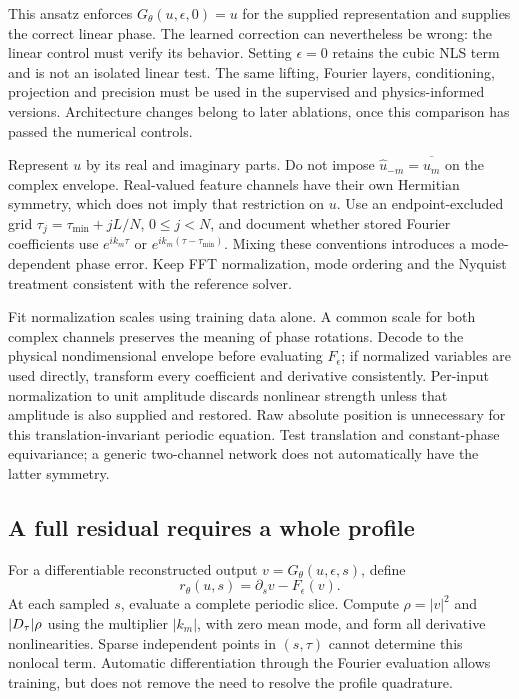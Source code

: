 This ansatz enforces $G_\theta(u,\epsilon,0)=u$ for the supplied
representation and supplies the correct linear phase.  The learned
correction can nevertheless be wrong: the linear control must verify
its behavior.  Setting $\epsilon=0$ retains the cubic NLS term and is
not an isolated linear test.  The same lifting, Fourier layers,
conditioning, projection and precision must be used in the supervised
and physics-informed versions.  Architecture changes belong to later
ablations, once this comparison has passed the numerical controls.

Represent $u$ by its real and imaginary parts.  Do not impose
$\widehat u_{-m}=\overline{\widehat u_m}$ on the complex envelope.
Real-valued feature channels have their own Hermitian symmetry, which
does not imply that restriction on $u$.  Use an endpoint-excluded grid
$\tau_j=\tau_{\min}+jL/N$, $0\leq j<N$, and document whether stored
Fourier coefficients use $e^{ik_m\tau}$ or
$e^{ik_m(\tau-\tau_{\min})}$.  Mixing these conventions introduces a
mode-dependent phase error.  Keep FFT normalization, mode ordering and
the Nyquist treatment consistent with the reference solver.

Fit normalization scales using training data alone.  A common scale for
both complex channels preserves the meaning of phase rotations.
Decode to the physical nondimensional envelope before evaluating
$F_\epsilon$; if normalized variables are used directly, transform
every coefficient and derivative consistently.  Per-input normalization
to unit amplitude discards nonlinear strength unless that amplitude is
also supplied and restored.  Raw absolute position is unnecessary for
this translation-invariant periodic equation.  Test translation and
constant-phase equivariance; a generic two-channel network does not
automatically have the latter symmetry.

\subsection{A full residual requires a whole profile}

For a differentiable reconstructed output $v=G_\theta(u,\epsilon,s)$,
define
\begin{equation}
 r_\theta(u,s)=\partial_s v-F_\epsilon(v).
 \label{eq:operator-residual}
\end{equation}
At each sampled $s$, evaluate a complete periodic slice.  Compute
$\rho=|v|^2$ and $\lvert D_\tau\rvert\rho$ using the multiplier $|k_m|$, with zero
mean mode, and form all derivative nonlinearities.  Sparse independent
points in $(s,\tau)$ cannot determine this nonlocal term.  Automatic
differentiation through the Fourier evaluation allows training, but
does not remove the need to resolve the profile quadrature.

